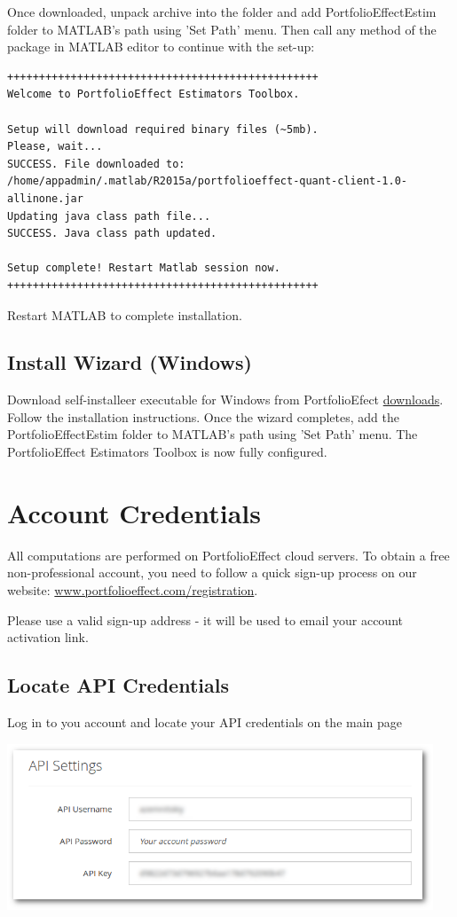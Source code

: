 \documentclass[letterpaper]{report}
\begin{document}
Once downloaded, unpack archive into the folder and add
PortfolioEffectEstim folder to MATLAB's path using 'Set Path' menu. Then call
any method of the package in MATLAB editor to continue with the set-up:
\begin{lstlisting}
+++++++++++++++++++++++++++++++++++++++++++++++++
Welcome to PortfolioEffect Estimators Toolbox.

Setup will download required binary files (~5mb).
Please, wait...
SUCCESS. File downloaded to: 
/home/appadmin/.matlab/R2015a/portfolioeffect-quant-client-1.0-allinone.jar
Updating java class path file...
SUCCESS. Java class path updated.

Setup complete! Restart Matlab session now.
+++++++++++++++++++++++++++++++++++++++++++++++++
\end{lstlisting}

Restart MATLAB to complete installation.

\section{Install Wizard (Windows)}
Download self-installeer executable for Windows from PortfolioEfect
\href{https://www.portfolioeffect.com/docs/platform/quant/downloads}{downloads}.
Follow the installation instructions. Once the wizard completes, add the
PortfolioEffectEstim folder to MATLAB's path using 'Set Path' menu. 
The PortfolioEffect Estimators Toolbox is now fully configured.

\chapter{Account Credentials}
All computations are performed on PortfolioEffect cloud servers.
To obtain a free non-professional account, you need to follow a quick sign-up
process on our website:
\href{https://www.portfolioeffect.com/registration}{www.portfolioeffect.com/registration}.\par
Please use a valid sign-up address - it will be used to email your
account activation link.

\section{Locate API Credentials} 
Log in to you account and locate your API credentials on the main page

\includegraphics[width=5in,natwidth=768,natheight=300]{img/api-settings.png}
 
\end{document}
